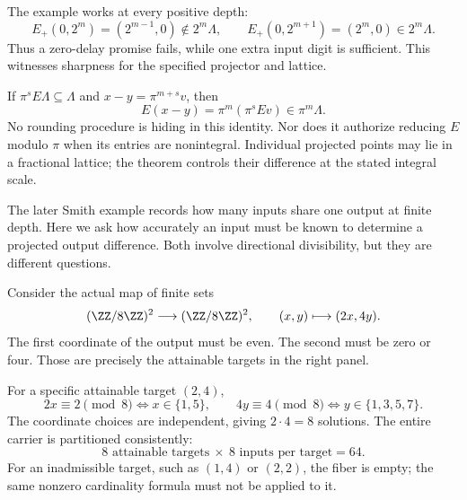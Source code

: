 
The example works at every positive depth:
\[
E_+(0,2^m)=(2^{m-1},0)\notin2^m\Lambda,
\qquad
E_+(0,2^{m+1})=(2^m,0)\in2^m\Lambda.
\]
Thus a zero-delay promise fails, while one extra input digit is sufficient. This witnesses sharpness for the specified projector and lattice.

If $\pi^sE\Lambda\subseteq\Lambda$ and $x-y=\pi^{m+s}v$, then
\[
E(x-y)=\pi^m(\pi^sEv)\in\pi^m\Lambda.
\]
No rounding procedure is hiding in this identity. Nor does it authorize reducing $E$ modulo $\pi$ when its entries are nonintegral. Individual projected points may lie in a fractional lattice; the theorem controls their difference at the stated integral scale.

The later Smith example records how many inputs share one output at finite depth. Here we ask how accurately an input must be known to determine a projected output difference. Both involve directional divisibility, but they are different questions.


Consider the actual map of finite sets
\[
(\ZZ/8\ZZ)^2\longrightarrow(\ZZ/8\ZZ)^2,
\qquad (x,y)\longmapsto(2x,4y).
\]
The first coordinate of the output must be even. The second must be zero or four. Those are precisely the attainable targets in the right panel.


For a specific attainable target $(2,4)$,
\[
2x\equiv2\pmod8\iff x\in\{1,5\},\qquad
4y\equiv4\pmod8\iff y\in\{1,3,5,7\}.
\]
The coordinate choices are independent, giving $2\cdot4=8$ solutions. The entire carrier is partitioned consistently:
\[
8\text{ attainable targets}\ \times\ 8\text{ inputs per target}=64.
\]
For an inadmissible target, such as $(1,4)$ or $(2,2)$, the fiber is empty; the same nonzero cardinality formula must not be applied to it.

